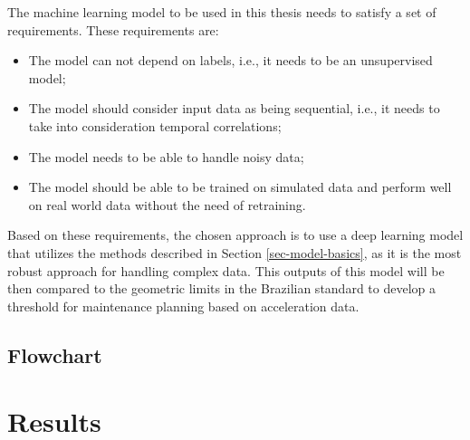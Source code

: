The machine learning model to be used in this thesis needs to satisfy a set of requirements. These requirements are:
\begin{itemize}
    \item The model can not depend on labels, i.e., it needs to be an unsupervised model;
    \item The model should consider input data as being sequential, i.e., it needs to take into consideration temporal correlations;
    \item The model needs to be able to handle noisy data;
    \item The model should be able to be trained on simulated data and perform well on real world data without the need of retraining.
\end{itemize}

Based on these requirements, the chosen approach is to use a deep learning model that utilizes the methods described in Section \ref{sec-model-basics}, as it is the most robust approach for handling complex data. This outputs of this model will be then compared to the geometric limits in the Brazilian standard to develop a threshold for maintenance planning based on acceleration data.

\section{Flowchart} \label{sec-flowchart}

\chapter{Results} \label{sec-Results}
